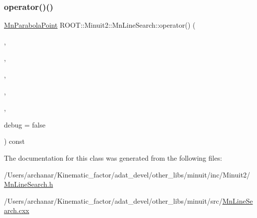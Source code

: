 \subsubsection{\texorpdfstring{operator()()}{operator()()}\hspace{0.1cm}{\footnotesize\ttfamily [2/2]}}
{\footnotesize\ttfamily \mbox{\hyperlink{classROOT_1_1Minuit2_1_1MnParabolaPoint}{Mn\+Parabola\+Point}} R\+O\+O\+T\+::\+Minuit2\+::\+Mn\+Line\+Search\+::operator() (\begin{DoxyParamCaption}\item[{const \mbox{\hyperlink{classROOT_1_1Minuit2_1_1MnFcn}{Mn\+Fcn}} \&}]{,  }\item[{const \mbox{\hyperlink{classROOT_1_1Minuit2_1_1MinimumParameters}{Minimum\+Parameters}} \&}]{,  }\item[{const \mbox{\hyperlink{namespaceROOT_1_1Minuit2_a62ed97730a1ca8d3fbaec64a19aa11c9}{Mn\+Algebraic\+Vector}} \&}]{,  }\item[{double}]{,  }\item[{const \mbox{\hyperlink{classROOT_1_1Minuit2_1_1MnMachinePrecision}{Mn\+Machine\+Precision}} \&}]{,  }\item[{bool}]{debug = {\ttfamily false} }\end{DoxyParamCaption}) const}



The documentation for this class was generated from the following files\+:\begin{DoxyCompactItemize}
\item 
/\+Users/archanar/\+Kinematic\+\_\+factor/adat\+\_\+devel/other\+\_\+libs/minuit/inc/\+Minuit2/\mbox{\hyperlink{other__libs_2minuit_2inc_2Minuit2_2MnLineSearch_8h}{Mn\+Line\+Search.\+h}}\item 
/\+Users/archanar/\+Kinematic\+\_\+factor/adat\+\_\+devel/other\+\_\+libs/minuit/src/\mbox{\hyperlink{MnLineSearch_8cxx}{Mn\+Line\+Search.\+cxx}}\end{DoxyCompactItemize}
